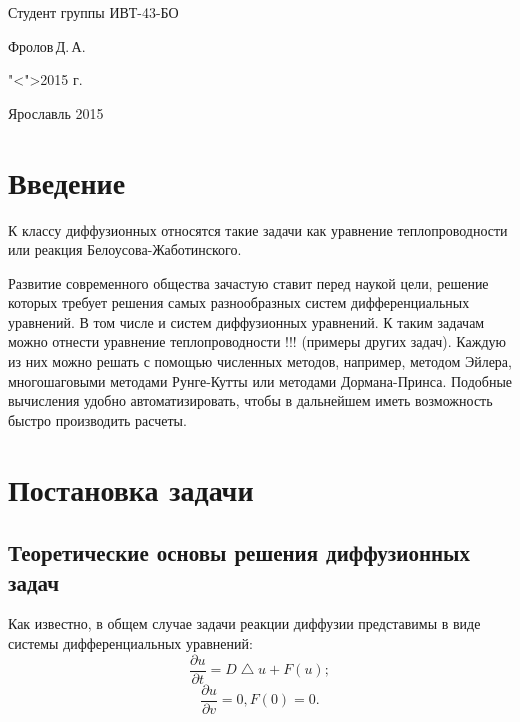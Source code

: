\documentclass[a4paper, 14pt]{extarticle}
\theoremstyle{definition}
\begin{document}
{\bigskip 

\begin{flushright}
	Студент группы ИВТ-43-БО\par
	\underline{\hspace{2.5cm}}Фролов\,Д.\,А.\par
	"<\underline{\hspace{0.8cm}}">\underline{\hspace{3.5cm}}2015 г.\par
\end{flushright}

\vspace{\fill}

\begin{center}
	Ярославль 2015
\end{center}

\clearpage

}

\tableofcontents

\section*{Введение}

\par К классу диффузионных относятся такие задачи как уравнение теплопроводности или реакция Белоусова-Жаботинского.

\par Развитие современного общества зачастую ставит перед наукой цели, решение которых требует решения самых разнообразных систем дифференциальных уравнений. В том числе и систем диффузионных уравнений. К таким задачам можно отнести уравнение теплопроводности !!! (примеры других задач). Каждую из них можно решать с помощью численных методов, например, методом Эйлера, многошаговыми методами Рунге-Кутты или методами Дормана-Принса. Подобные вычисления удобно автоматизировать, чтобы в дальнейшем иметь возможность быстро производить расчеты.

\section{Постановка задачи}

\subsection{Теоретические основы решения диффузионных задач}

\par Как известно, в общем случае задачи реакции диффузии представимы в виде системы дифференциальных уравнений:
$$\frac{\partial u}{\partial t} = D \bigtriangleup u + F(u);$$
$$\frac{\partial u}{\partial v} = 0, F(0) = 0.$$
\end{document}
